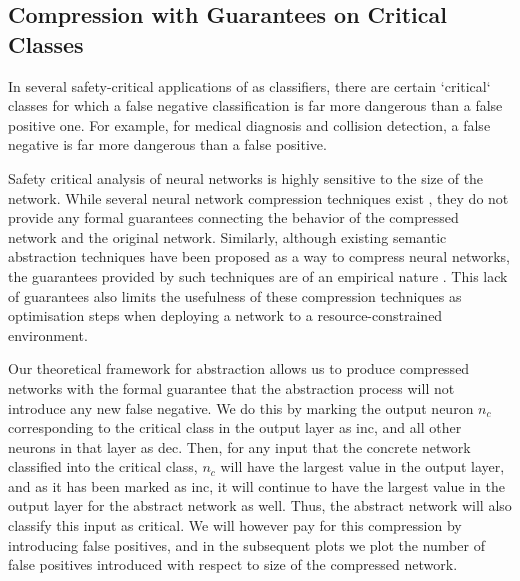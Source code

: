 \subsection{Compression with Guarantees on Critical Classes}
\label{s:exp-mnist-comp}


In several safety-critical applications of \dnn as classifiers, there are
certain `critical` classes for which a false negative classification is far more
dangerous than a false positive one. For example, for medical diagnosis and
collision detection, a false negative is far more dangerous than a false
positive.

Safety critical analysis of neural networks is highly sensitive to the size of
the network. While several neural network compression techniques exist 
\cite{dnn-compression}, they do not provide any formal guarantees 
connecting the behavior of the compressed network and the original network. Similarly,
although existing semantic abstraction techniques have been proposed as 
a way to compress neural networks, the guarantees provided by such 
techniques are of an empirical nature \cite{lin-comb-abs-jan}.
This lack of guarantees also limits the usefulness of these compression
techniques as optimisation steps when deploying a network to a
resource-constrained environment. 

Our theoretical framework for abstraction allows us to produce compressed
networks with the formal guarantee that the abstraction process will not
introduce any new false negative. We do this by marking the output neuron $n_c$
corresponding to the critical class in the output layer as inc, and all other
neurons in that layer as dec.  Then, for any input that the concrete network
classified into the critical class, $n_c$ will have the largest value in the
output layer, and as it has been marked as inc, it will continue to have the
largest value in the output layer for the abstract network as well. Thus, the
abstract network will also classify this input as critical. We will however pay
for this compression by introducing false positives, and in the subsequent plots
we plot the number of false positives introduced with respect to size of the
compressed network.

